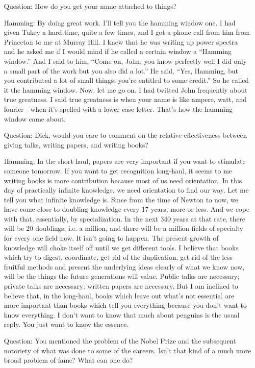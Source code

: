 \documentclass{article}
\begin{document}
Question: How do you get your name attached to things?

Hamming: By doing great work. I'll tell you the hamming window one. I had given Tukey a hard time, quite a few times, and I got a phone call from him from Princeton to me at Murray Hill. I knew that he was writing up power spectra and he asked me if I would mind if he called a certain window a ``Hamming window.'' And I said to him, ``Come on, John; you know perfectly well I did only a small part of the work but you also did a lot.'' He said, ``Yes, Hamming, but you contributed a lot of small things; you're entitled to some credit.'' So he called it the hamming window. Now, let me go on. I had twitted John frequently about true greatness. I said true greatness is when your name is like ampere, watt, and fourier - when it's spelled with a lower case letter. That's how the hamming window came about.

Question: Dick, would you care to comment on the relative effectiveness between giving talks, writing papers, and writing books?

Hamming: In the short-haul, papers are very important if you want to stimulate someone tomorrow. If you want to get recognition long-haul, it seems to me writing books is more contribution because most of us need orientation. In this day of practically infinite knowledge, we need orientation to find our way. Let me tell you what infinite knowledge is. Since from the time of Newton to now, we have come close to doubling knowledge every 17 years, more or less. And we cope with that, essentially, by specialization. In the next 340 years at that rate, there will be 20 doublings, i.e. a million, and there will be a million fields of specialty for every one field now. It isn't going to happen. The present growth of knowledge will choke itself off until we get different tools. I believe that books which try to digest, coordinate, get rid of the duplication, get rid of the less fruitful methods and present the underlying ideas clearly of what we know now, will be the things the future generations will value. Public talks are necessary; private talks are necessary; written papers are necessary. But I am inclined to believe that, in the long-haul, books which leave out what's not essential are more important than books which tell you everything because you don't want to know everything. I don't want to know that much about penguins is the usual reply. You just want to know the essence.

Question: You mentioned the problem of the Nobel Prize and the subsequent notoriety of what was done to some of the careers. Isn't that kind of a much more broad problem of fame? What can one do?
\end{document}
